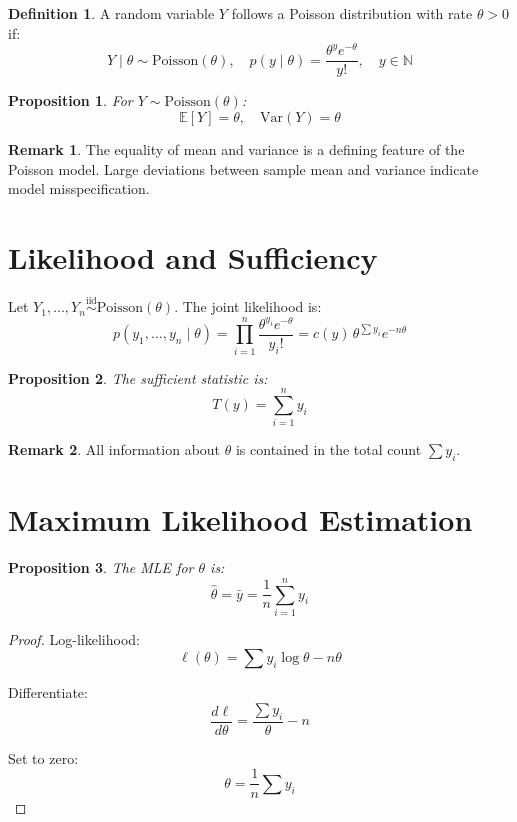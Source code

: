 \documentclass[12pt,oneside]{book}
\numberwithin{equation}{section}
\theoremstyle{definition}
\newtheorem{definition}{Definition}[section]
\newtheorem{remark}{Remark}[section]
\theoremstyle{plain}
\newtheorem{proposition}{Proposition}[section]
\theoremstyle{remark}
\newcommand{\N}{\mathbb{N}}
\newcommand{\E}{\mathbb{E}}
\newcommand{\Var}{\mathrm{Var}}
\newcommand{\iid}{\overset{\text{iid}}{\sim}}
\newcommand{\Pois}{\mathrm{Poisson}}
\begin{document}
\begin{definition}
A random variable $Y$ follows a Poisson distribution with rate $\theta > 0$ if:
$$
Y \mid \theta \sim \Pois(\theta), \quad
p(y \mid \theta) = \frac{\theta^y e^{-\theta}}{y!}, \quad y \in \N
$$
\end{definition}

\begin{proposition}
For $Y \sim \Pois(\theta)$:
$$
\E[Y] = \theta, \quad \Var(Y) = \theta
$$
\end{proposition}

\begin{remark}
The equality of mean and variance is a defining feature of the Poisson model. Large deviations between sample mean and variance indicate model misspecification.
\end{remark}

\section{Likelihood and Sufficiency}

Let $Y_1,\dots,Y_n \iid \Pois(\theta)$. The joint likelihood is:
$$
p(y_1,\dots,y_n \mid \theta)
= \prod_{i=1}^n \frac{\theta^{y_i} e^{-\theta}}{y_i!}
= c(y)\,\theta^{\sum y_i} e^{-n\theta}
$$

\begin{proposition}
The sufficient statistic is:
$$
T(y) = \sum_{i=1}^n y_i
$$
\end{proposition}

\begin{remark}
All information about $\theta$ is contained in the total count $\sum y_i$.
\end{remark}

\section{Maximum Likelihood Estimation}

\begin{proposition}
The MLE for $\theta$ is:
$$
\hat{\theta} = \bar{y} = \frac{1}{n}\sum_{i=1}^n y_i
$$
\end{proposition}

\begin{proof}
Log-likelihood:
$$
\ell(\theta) = \sum y_i \log \theta - n\theta
$$

Differentiate:
$$
\frac{d\ell}{d\theta} = \frac{\sum y_i}{\theta} - n
$$

Set to zero:
$$
\theta = \frac{1}{n}\sum y_i
$$
\end{proof}
\end{document}
